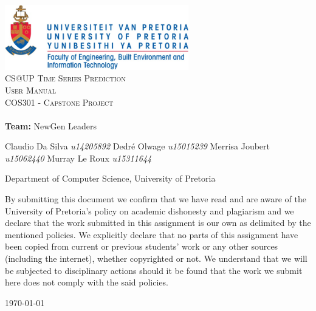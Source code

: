 \documentclass[a4paper,12pt]{article}
\begin{document}
	
	\begin{titlepage}
		\begin{center}
			
			\includegraphics[width=0.6\textwidth]{../images/up_logo.jpg}\\[2.0cm] 
			
			
			\textsc{\LARGE CS@UP Time Series Prediction}\\[1.0cm]
			
			
			\textsc{\Large User Manual}\\[0.75cm]
			
			
			\textsc{\Large COS301 - Capstone Project}\\[0.75cm]
			
			
			\textbf{\huge \\ Team:}
			\huge NewGen Leaders \\
			\begin{flushright} \large
				Claudio Da Silva		\emph{u14205892} \newline
				Dedr\'e Olwage	    	\emph{u15015239} \newline
				Merrisa Joubert			\emph{u15062440} \newline
				Murray Le Roux	    	\emph{u15311644} \newline
			\end{flushright}
			\small Department of Computer Science, University of Pretoria \\ 
			
			
		\end{center}
		
		\noindent By submitting this document we confirm that we have read and are aware of the University of Pretoria's policy on academic dishonesty and plagiarism and we declare that the work submitted in this assignment is our own as delimited by the mentioned policies. We explicitly declare that no parts of this assignment have been copied from current or previous students' work or any other sources (including the internet), whether copyrighted or not. We understand that we will be subjected to disciplinary actions should it be found that the work we submit here does not comply with the said policies.
		
		\begin{center}
			
			\vfill
			
			{\large \today}
			
		\end{center}
		
	\end{titlepage}
    
\end{document}
